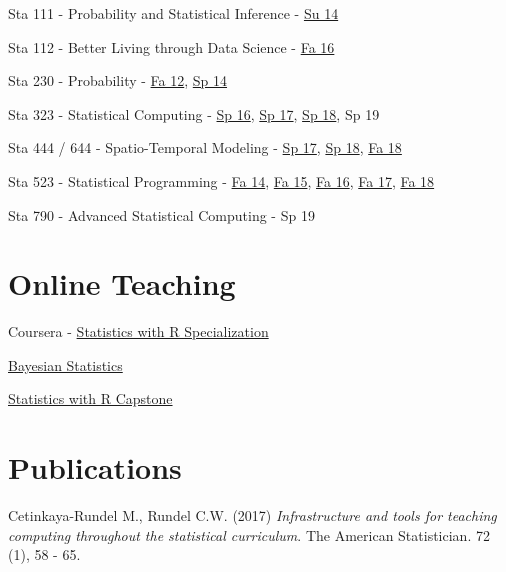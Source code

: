\documentclass[margin,line]{res}
\begin{document}
\begin{resume}
Sta 111 - Probability and Statistical Inference - \href{https://stat.duke.edu/~cr173/Sta111_Su14/}{Su 14}

Sta 112 - Better Living through Data Science - \href{http://stat.duke.edu/~cr173/Sta112_Fa16/}{Fa 16}

Sta 230 - Probability - \href{http://stat.duke.edu/courses/Spring12/sta104.1}{Fa 12}, \href{https://stat.duke.edu/~cr173/Sta230_Sp14/}{Sp 14}

Sta 323 - Statistical Computing - \href{http://stat.duke.edu/~cr173/Sta323_Sp16/}{Sp 16}, \href{http://stat.duke.edu/~cr173/Sta323_Sp17/}{Sp 17}, \href{http://stat.duke.edu/~cr173/Sta323_Sp18/}{Sp 18}, Sp 19

Sta 444 / 644 - Spatio-Temporal Modeling - \href{http://stat.duke.edu/~cr173/Sta444_Sp17/}{Sp 17}, \href{http://stat.duke.edu/~cr173/Sta444_Sp18/}{Sp 18}, \href{http://stat.duke.edu/~cr173/Sta444_Fa18/}{Fa 18}

Sta 523 - Statistical Programming - \href{https://stat.duke.edu/~cr173/Sta523_Fa14/}{Fa 14}, \href{https://stat.duke.edu/~cr173/Sta523_Fa15/}{Fa 15}, \href{https://stat.duke.edu/~cr173/Sta523_Fa16/}{Fa 16}, \href{https://stat.duke.edu/~cr173/Sta523_Fa17/}{Fa 17}, \href{https://stat.duke.edu/~cr173/Sta523_Fa18/}{Fa 18}

Sta 790 - Advanced Statistical Computing - Sp 19

\pagebreak


\section{\sc Online Teaching}

Coursera - \href{https://www.coursera.org/specializations/statistics}{Statistics with R Specialization}
\begin{list1}
\item[] \href{https://www.coursera.org/learn/bayesian}{Bayesian Statistics}
\item[] \href{https://www.coursera.org/learn/statistics-project}{Statistics with R Capstone}
\end{list1}

\section{\sc Publications}

Cetinkaya-Rundel M., Rundel C.W. (2017) {\em Infrastructure and tools for teaching computing throughout the statistical curriculum}. The American Statistician. 72 (1), 58 - 65.


\end{resume}
\end{document}
